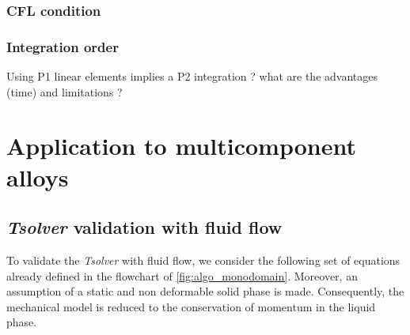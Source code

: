 \subsubsection{CFL condition}
%
\subsubsection{Integration order}
%
Using P1 linear elements implies a P2 integration ? what are the advantages (time) and limitations ?





\section{Application to multicomponent alloys}

\subsection{\emph{Tsolver} validation with fluid flow}

To validate the \emph{Tsolver} with fluid flow, we consider the following set of equations
already defined in the flowchart of \cref{fig:algo_monodomain}. Moreover, an assumption 
of a static and non deformable solid phase is made. Consequently, the mechanical model is 
reduced to the conservation of momentum in the liquid phase. 

%

